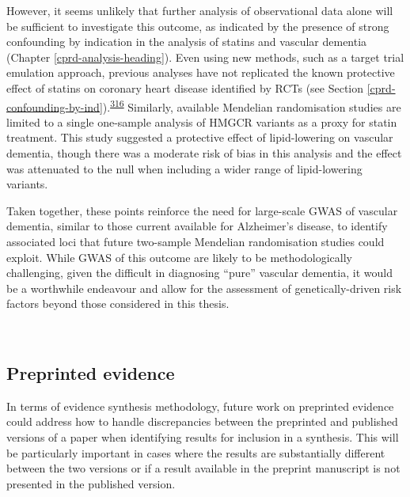\documentclass[a4paper, twoside]{templates/ociamthesis}
\begin{document}
However, it seems unlikely that further analysis of observational data alone will be sufficient to investigate this outcome, as indicated by the presence of strong confounding by indication in the analysis of statins and vascular dementia (Chapter \ref{cprd-analysis-heading}). Even using new methods, such as a target trial emulation approach, previous analyses have not replicated the known protective effect of statins on coronary heart disease identified by RCTs (see Section \ref{cprd-confounding-by-ind}).\textsuperscript{\protect\hyperlink{ref-danaei2013}{316}} Similarly, available Mendelian randomisation studies are limited to a single one-sample analysis of HMGCR variants as a proxy for statin treatment. This study suggested a protective effect of lipid-lowering on vascular dementia, though there was a moderate risk of bias in this analysis and the effect was attenuated to the null when including a wider range of lipid-lowering variants.

Taken together, these points reinforce the need for large-scale GWAS of vascular dementia, similar to those current available for Alzheimer's disease, to identify associated loci that future two-sample Mendelian randomisation studies could exploit. While GWAS of this outcome are likely to be methodologically challenging, given the difficult in diagnosing ``pure'' vascular dementia, it would be a worthwhile endeavour and allow for the assessment of genetically-driven risk factors beyond those considered in this thesis.

~

\hypertarget{preprinted-evidence}{%
\subsection{Preprinted evidence}\label{preprinted-evidence}}

In terms of evidence synthesis methodology, future work on preprinted evidence could address how to handle discrepancies between the preprinted and published versions of a paper when identifying results for inclusion in a synthesis. This will be particularly important in cases where the results are substantially different between the two versions or if a result available in the preprint manuscript is not presented in the published version.
\end{document}

